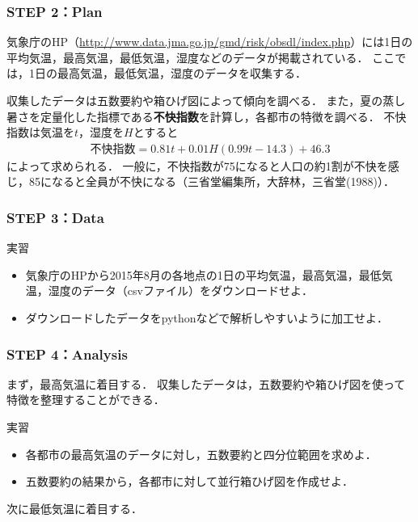\subsubsection*{STEP 2：Plan}
%
気象庁のHP（\url{http://www.data.jma.go.jp/gmd/risk/obsdl/index.php}）には1日の平均気温，最高気温，最低気温，湿度などのデータが掲載されている．
%
ここでは，1日の最高気温，最低気温，湿度のデータを収集する．
%

%
収集したデータは五数要約や箱ひげ図によって傾向を調べる．
%
また，夏の蒸し暑さを定量化した指標である\textbf{不快指数}を計算し，各都市の特徴を調べる．
%
不快指数は気温を$ t $，湿度を$ H $とすると
%
\begin{align}
	不快指数=0.81t + 0.01H(0.99t-14.3)+46.3
	\label{eq:hukai}
\end{align}
%
によって求められる．
%
一般に，不快指数が75になると人口の約1割が不快を感じ，85になると全員が不快になる（三省堂編集所，大辞林，三省堂(1988)）．
%

\subsubsection*{STEP 3：Data}
%
\begin{itembox}[l]{実習}
%
\begin{itemize}
\item
気象庁のHPから2015年8月の各地点の1日の平均気温，最高気温，最低気温，湿度のデータ（csvファイル）をダウンロードせよ．
\item
ダウンロードしたデータをpythonなどで解析しやすいように加工せよ．
\end{itemize}
%
\end{itembox}

\subsubsection*{STEP 4：Analysis}
%
まず，最高気温に着目する．
%
収集したデータは，五数要約や箱ひげ図を使って特徴を整理することができる．
%

%
\begin{itembox}[l]{実習}
%
\begin{itemize}
\item
各都市の最高気温のデータに対し，五数要約と四分位範囲を求めよ．
\item 
五数要約の結果から，各都市に対して並行箱ひげ図を作成せよ．
\end{itemize}
%
\end{itembox}
%

%
\vspace{0.5cm}
次に最低気温に着目する．
%
%

